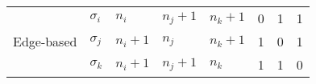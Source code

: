 \begin{large}
\begin{center}
\begin{tabular}{ l l|l|l|l|l|l|l|}
  \multicolumn{1}{|l}{\multirow{3}{*}{\sf Edge-based}}         %
      &   $\sigma_i$                                           %
          &   $n_i$ &   $n_j+1$   &   $n_k+1$                  %
              &   0   &   1   &   1                        \\  %
  \cline{2-8} %
  \multicolumn{1}{|c}{}                                        %
      &   $\sigma_j$                                           %
          &   $n_i+1$ &   $n_j$   &   $n_k+1$                  %
              &   1   &   0   &   1                        \\  %
  \cline{2-8} %
  \multicolumn{1}{|c}{}                                        %
      &   $\sigma_k$                                           %
          &   $n_i+1$ &   $n_j+1$   &   $n_k$                  %
              &   1   &   1   &   0                        \\  %
  \hline      %
\end{tabular}
\end{center}
\end{large}


% 
